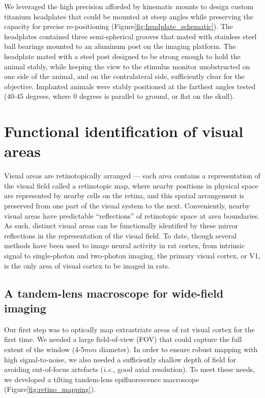 We leveraged the high precision afforded by kinematic mounts to design custom titanium headplates that could be mounted at steep angles while preserving the capacity for precise re-positioning (Figure\ref{fig:headplate_schematic}). The headplates contained three semi-spherical grooves that mated with stainless steel ball bearings mounted to an aluminum post on the imaging platform. The headplate mated with a steel post designed to be strong enough to hold the animal stably, while keeping the view to the stimulus monitor unobstructed on one side of the animal, and on the contralateral side, sufficiently clear for the objective. Implanted animals were stably positioned at the farthest angles tested (40-45 degrees, where 0 degrees is parallel to ground, or flat on the skull).  

\section{Functional identification of visual areas}
Visual areas are retinotopically arranged --- each area contains a representation of the visual field called a retinotopic map, where nearby positions in physical space are represented by nearby cells on the retina, and this spatial arrangement is preserved from one part of the visual system to the next\cite{REFREF}. Conveniently, nearby visual areas have predictable ``reflections'' of retinotopic space at area boundaries. As such, distinct visual areas can be functionally identified by these mirror reflections in the representation of the visual field. To date, though several methods have been used to image neural activity in rat cortex, from intrinsic signal\cite{Gias2004} to single-photon \cite{Scott2018ImagingMacroscope} and two-photon \cite{Ohki2005, Greenberg2008} imaging, the primary visual cortex, or V1, is the only area of visual cortex to be imaged in rats.

\subsection{A tandem-lens macroscope for wide-field imaging}
Our first step was to optically map extrastriate areas of rat visual cortex for the first time. We needed a large field-of-view (FOV) that could capture the full extent of the window (4-5$mm$ diameter). In order to ensure robust mapping with high signal-to-noise, we also needed a sufficiently shallow depth of field for avoiding out-of-focus artefacts (\textit{i.e.}, good axial resolution). To meet these needs, we developed a tilting tandem-lens epifluorescence macroscope\cite{Ratzlaff1991} (Figure\ref{fig:retino_mapping}). 

